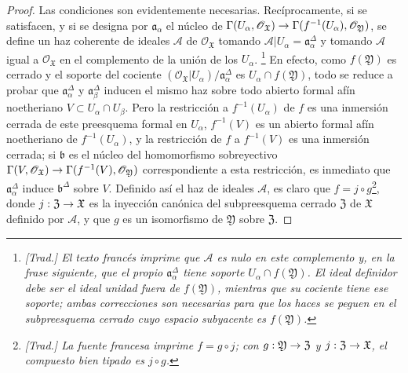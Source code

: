 \documentclass[oneside]{amsart}
\theoremstyle{ega-env-style}
\theoremstyle{ega-thm-env-style}
\theoremstyle{ega-defn-env-style}
\def\mathcal{\mathscr}
\def\sh{\mathcal}                   %
\renewcommand{\to}{\mathchoice{\longrightarrow}{\rightarrow}{\rightarrow}{\rightarrow}}
\begin{document}
\begin{proof}
Las condiciones son evidentemente necesarias.
Recíprocamente, si se satisfacen, y si se designa por $\mathfrak{a}_\alpha$ el núcleo de $\Gamma(U_\alpha,\mathscr{O}_{\mathfrak{X}})\to
\Gamma(f^{-1}(U_\alpha),\mathscr{O}_{\mathfrak{Y}})$, se define un haz coherente de ideales $\mathscr{A}$ de $\mathscr{O}_{\mathfrak{X}}$ tomando $\mathscr{A}|U_\alpha=\mathfrak{a}_\alpha^\Delta$ y tomando $\mathscr{A}$ igual a $\mathscr{O}_{\mathfrak{X}}$ en el complemento de la unión de los $U_\alpha$.
\footnote{\emph{[Trad.] El texto francés imprime que $\sh{A}$ es nulo en este complemento y, en la frase siguiente, que el propio $\mathfrak{a}_\alpha^\Delta$ tiene soporte $U_\alpha\cap f(\mathfrak{Y})$. El ideal definidor debe ser el ideal unidad fuera de $f(\mathfrak{Y})$, mientras que su cociente tiene ese soporte; ambas correcciones son necesarias para que los haces se peguen en el subpreesquema cerrado cuyo espacio subyacente es $f(\mathfrak{Y})$.}}
En efecto, como $f(\mathfrak{Y})$ es cerrado y el soporte del cociente $(\mathscr{O}_{\mathfrak{X}}|U_\alpha)/\mathfrak{a}_\alpha^\Delta$ es $U_\alpha\cap f(\mathfrak{Y})$, todo se reduce a probar que $\mathfrak{a}_\alpha^\Delta$ y $\mathfrak{a}_\beta^\Delta$ inducen el mismo haz sobre todo abierto formal afín noetheriano $V\subset U_\alpha\cap U_\beta$.
Pero la restricción a $f^{-1}(U_\alpha)$ de $f$ es una inmersión cerrada de este preesquema formal en $U_\alpha$, $f^{-1}(V)$ es un abierto formal afín noetheriano de $f^{-1}(U_\alpha)$, y la restricción de $f$ a $f^{-1}(V)$ es una inmersión cerrada;
si $\mathfrak{b}$ es el núcleo del homomorfismo sobreyectivo $\Gamma(V,\mathscr{O}_{\mathfrak{X}})\to
\Gamma(f^{-1}(V),\mathscr{O}_{\mathfrak{Y}})$ correspondiente a esta restricción, es inmediato  que $\mathfrak{a}_\alpha^\Delta$ induce $\mathfrak{b}^\Delta$ sobre $V$.
Definido así el haz de ideales $\mathscr{A}$, es claro que $f=j\circ g$\footnote{\emph{[Trad.] La fuente francesa imprime $f=g\circ j$; con $g:\mathfrak{Y}\to\mathfrak{Z}$ y $j:\mathfrak{Z}\to\mathfrak{X}$, el compuesto bien tipado es $j\circ g$.}}, donde $j:\mathfrak{Z}\to\mathfrak{X}$ es la inyección canónica del subpreesquema cerrado $\mathfrak{Z}$ de $\mathfrak{X}$ definido por $\mathscr{A}$, y que $g$ es un isomorfismo de $\mathfrak{Y}$ sobre $\mathfrak{Z}$.
\end{proof}
\end{document}
